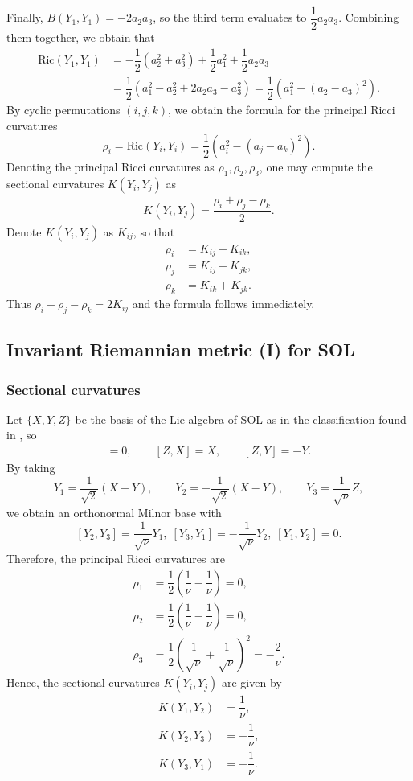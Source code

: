 \documentclass[12pt]{article}
\begin{document}
Finally, $B(Y_1,Y_1) = -2a_2a_3$, so the third term evaluates to $\dfrac{1}{2}a_2a_3$. Combining them together, we obtain that \begin{align*}
    \text{Ric}(Y_1,Y_1) &= -\dfrac{1}{2}(a_2^2 + a_3^2) + \dfrac{1}{2}a_1^2 + \dfrac{1}{2}a_2a_3 \\ 
    &= \dfrac{1}{2}(a_1^2 - a_2^2 + 2a_2a_3 - a_3^2) = \dfrac{1}{2}(a_1^2 - (a_2-a_3)^2).
\end{align*} 
By cyclic permutations $(i,j,k)$, we obtain the formula for the principal Ricci curvatures
$$\rho_i = \text{Ric}(Y_i,Y_i) = \dfrac{1}{2}(a_i^2 - (a_j - a_k)^2).$$
Denoting the principal Ricci curvatures as $\rho_1,\rho_2,\rho_3$, one may compute the sectional curvatures $K(Y_i,Y_j)$ as \begin{align*}
    K(Y_i,Y_j) = \dfrac{\rho_i + \rho_j - \rho_k}{2}.
\end{align*}
Denote $K(Y_i,Y_j)$ as $K_{ij}$, so that \begin{align*}
    \rho_i &= K_{ij}+ K_{ik},\\
    \rho_j &= K_{ij} + K_{jk}, \\
    \rho_k &= K_{ik} + K_{jk}.
\end{align*}
Thus $\rho_i + \rho_j - \rho_k = 2K_{ij}$ and the formula follows immediately.

\subsection{Invariant Riemannian metric (I) for SOL}
\subsubsection{Sectional curvatures}
Let $\{X,Y,Z\}$ be the basis of the Lie algebra of SOL as in the classification found in \cite{KHL}, so \begin{align*}
    [X, Y] = 0, \qquad [Z,X] = X, \qquad [Z, Y] = -Y.
\end{align*}
By taking $$Y_1 = \dfrac{1}{\sqrt{2}}(X+Y),\qquad Y_2 = -\dfrac{1}{\sqrt{2}}(X-Y), \qquad Y_3 = \dfrac{1}{\sqrt{\nu}}Z, $$
we obtain an orthonormal Milnor base with $$[Y_2,Y_3] = \dfrac{1}{\sqrt{\nu}} Y_1,\; [Y_3,Y_1] = -\dfrac{1}{\sqrt{\nu}}Y_2,\; [Y_1,Y_2] = 0.$$
Therefore, the principal Ricci curvatures are \begin{align*}
    \rho_1 &= \dfrac{1}{2}\left(\dfrac{1}{\nu}-\dfrac{1}{\nu}\right) = 0, \\
    \rho_2 &= \dfrac{1}{2}\left(\dfrac{1}{\nu} - \dfrac{1}{\nu}\right) = 0, \\
    \rho_3 &= \dfrac{1}{2} \left(\dfrac{1}{\sqrt{\nu} } + \dfrac{1}{\sqrt{\nu}}\right)^2 = -\dfrac{2}{\nu}.
\end{align*}
Hence, the sectional curvatures $K(Y_i,Y_j)$ are given by \begin{align*}
    K(Y_1,Y_2) &=  \dfrac{1}{\nu}, \\
    K(Y_2,Y_3) &= -\dfrac{1}{\nu}, \\
    K(Y_3,Y_1) &= -\dfrac{1}{\nu}.
\end{align*}
\end{document}
